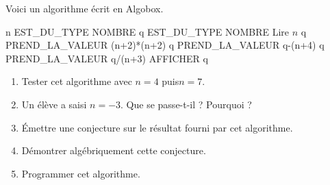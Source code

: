 
Voici un algorithme écrit en Algobox.

\begin{algobox}
\Variables
\Ligne n EST\_DU\_TYPE NOMBRE
\Ligne q EST\_DU\_TYPE NOMBRE
\DebutAlgo
\Ligne Lire $n$
\Ligne q PREND\_LA\_VALEUR (n+2)*(n+2)
\Ligne q PREND\_LA\_VALEUR q-(n+4)
\Ligne q PREND\_LA\_VALEUR q/(n+3)
\Ligne AFFICHER q
\FinAlgo
\end{algobox}


\begin{enumerate}
\item Tester cet algorithme avec $n=4$ puis$n=7$. 
\item Un élève a saisi $n=-3$. Que se passe-t-il ? Pourquoi ? 
\item Émettre une conjecture sur le résultat fourni par cet algorithme.
\item Démontrer algébriquement cette conjecture. 
\item Programmer cet algorithme.
\end{enumerate}